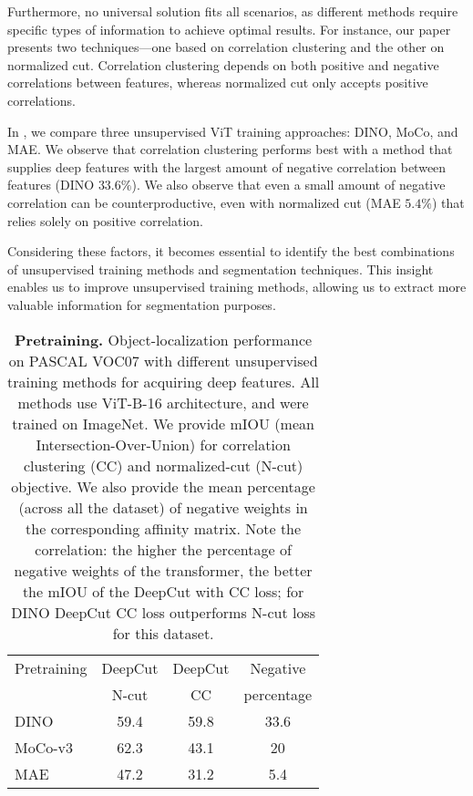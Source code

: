 \documentclass[10pt,twocolumn,letterpaper]{article}
\begin{document}
Furthermore, no universal solution fits all scenarios, as different methods require specific types of information to achieve optimal results. For instance, our paper presents two techniques—one based on correlation clustering and the other on normalized cut. Correlation clustering depends on both positive and negative correlations between features, whereas normalized cut only accepts positive correlations.

In , we compare three unsupervised ViT training approaches: DINO\cite{caron2021emerging}, MoCo\cite{chen2021empirical}, and MAE\cite{he2022masked}. We observe that correlation clustering performs best with a method that supplies deep features with the largest amount of negative correlation between features (DINO $33.6\%$). We also observe that even a small amount of negative correlation can be counterproductive, even with normalized cut (MAE $5.4\%$) that relies solely on positive correlation.

Considering these factors, it becomes essential to identify the best combinations of unsupervised training methods and segmentation techniques. This insight enables us to improve unsupervised training methods, allowing us to extract more valuable information for segmentation purposes.



\begin{table}
  \centering
  \begin{tabular}{@{}lc c c@{}}
    \toprule
    Pretraining  & DeepCut & DeepCut  &Negative   \\
     &  N-cut & CC & percentage  \\

        \midrule
    DINO\cite{caron2021emerging}  & 59.4 & 59.8 & 33.6\\
    MoCo-v3\cite{chen2021empirical}  & 62.3 & 43.1 & 20\\
    MAE \cite{he2022masked}  & 47.2 &  31.2 & 5.4\\

    \bottomrule
  \end{tabular}
  \caption{\textbf{Pretraining.} Object-localization performance on PASCAL VOC07\cite{pascal-voc-2007}
  with different unsupervised training methods for acquiring deep features. All methods use ViT-B-16 architecture, and were trained on ImageNet\cite{ILSVRC15}.
  We provide mIOU (mean Intersection-Over-Union) for correlation clustering (CC) and normalized-cut (N-cut) objective.
  We also provide the mean percentage (across all the dataset) of negative weights in the corresponding affinity matrix. Note the correlation: the higher the percentage of negative weights of the transformer, the better the mIOU of the DeepCut with CC loss; for DINO DeepCut CC loss outperforms N-cut loss for this dataset.
  }
  \label{tab:feats}
\end{table}
\end{document}
